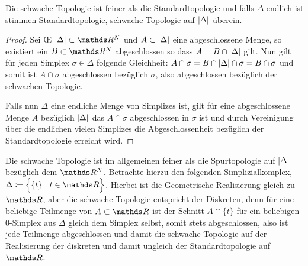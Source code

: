 \begin{Lem}
	Die schwache Topologie ist feiner als die Standardtopologie und
	falls $\Delta$ endlich ist stimmen Standardtopologie, schwache
	Topologie auf $\left| \Delta \right|$ überein.
	\begin{proof}
		Sei \OE\; $\gr{\Delta} \subset \R^N$ und $A \subset \left| \Delta \right|$
		eine abgeschlossene Menge, so existiert ein $B \subset \R^N$
		abgeschlossen so dass $A = B \cap \left| \Delta \right|$ gilt. Nun gilt für
		jeden Simplex $\sigma \in \Delta$ folgende Gleichheit:
		$A \cap \sigma = B \cap \left| \Delta \right| \cap \sigma = B \cap \sigma$
		und somit ist $A \cap \sigma$ abgeschlossen bezüglich $\sigma$,
		also abgeschlossen bezüglich der schwachen Topologie.
		
		Falls nun $\Delta$ eine endliche Menge von Simplizes ist, gilt für
		eine abgeschlossene Menge $A$ bezüglich $\left| \Delta \right|$ das
		$A \cap \sigma$ abgeschlossen in $\sigma$ ist und durch
		Vereinigung über die endlichen vielen Simplizes die
		Abgeschlossenheit bezüglich der Standardtopologie erreicht wird.
	\end{proof}
\end{Lem}

\begin{Bem}
	Die schwache Topologie ist im allgemeinen feiner als die
	Spurtopologie auf $\left| \Delta \right|$ bezüglich dem $\R^N$. Betrachte
	hierzu den folgenden Simplizialkomplex,
	$\Delta \coloneqq \set{ \{t\} }{t \in \R}$.  Hierbei ist die
	Geometrische Realisierung gleich zu $\R$, aber die schwache
	Topologie entspricht der Diskreten, denn für eine beliebige
	Teilmenge von $A \subset \R$ ist der Schnitt $A \cap \{ t \}$ für
	ein beliebigen $0$-Simplex aus $\Delta$ gleich dem Simplex selbst,
	somit stets abgeschlossen, also ist jede Teilmenge abgeschlossen und
	damit die schwache Topologie auf der Realisierung der diskreten und
	damit ungleich der Standardtopologie auf $\R$.
\end{Bem}







